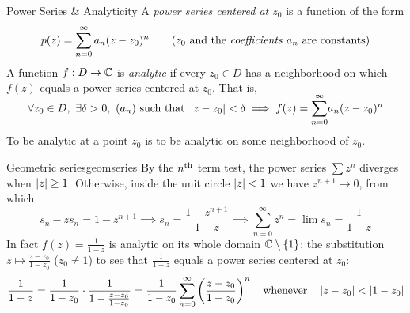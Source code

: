 \goodbreak
% 
%   
%   
%   
 

\begin{defn}{Power Series \& Analyticity}{}
	A \emph{power series centered at $z_0$} is a function of the form
	\[
		p(z)=\sum_{n=0}^\infty a_n(z-z_0)^n \tag{$z_0$ and the \emph{coefficients} $a_n$ are constants}
	\]
	A function $f:D\to\mathbb{C}$ is \emph{analytic} if every $z_0\in D$ has a neighborhood on which $f(z)$ equals a power series centered at $z_0$. That is,
	\[
		\forall z_0\in D,\ \exists\delta>0,\ (a_n)\text{ such that }\nm{z-z_0}<\delta\implies f(z)=\smash[t]{\sum_{n=0}^\infty} a_n(z-z_0)^n
	\]
	To be analytic at a point $z_0$ is to be analytic on some neighborhood of $z_0$.
\end{defn}


\begin{example}{Geometric series}{geomseries}
	By the $n\textsuperscript{th}$ term test, the power series $\sum\limits z^n$ diverges when $\left| z\right|\ge 1$. Otherwise, inside the unit circle $\left| z\right|<1$ we have $z^{n+1}\to 0$, from which
	\[
		s_n-zs_n=1-z^{n+1}\implies s_n=\frac{1-z^{n+1}}{1-z} \implies \sum\limits_{n=0}^\infty z^n =\lim s_n=\frac 1{1-z}
	\]
	In fact $f(z)=\frac 1{1-z}$ is analytic on its whole domain $\mathbb{C}\setminus\{1\}$: the substitution $z\mapsto\frac{z-z_0}{1-z_0}$ ($z_0\neq 1$) to see that $\frac 1{1-z}$ equals a power series centered at $z_0$:
	\[
		\frac 1{1-z} =\frac 1{1-z_0}\cdot \frac 1{1-\frac{z-z_0}{1-z_0}}=\frac 1{1-z_0}\sum_{n=0}^\infty \left(\frac{z-z_0}{1-z_0}\right)^n
		\quad\text{whenever}\quad
		\left| z-z_0\right|<\left| 1-z_0\right|
	\]
\end{example}


